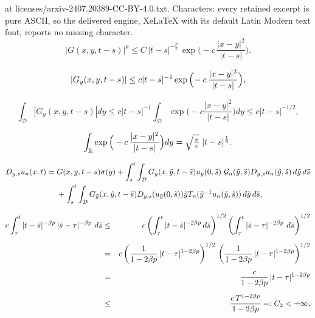 \documentclass[10pt,a4paper]{amsart}
\newcommand{\cd}{\mathcal{D}}
\newcommand{\cg}{\mathcal{G}}
\begin{document}
at licenses/arxiv-2407.20389-CC-BY-4.0.txt. Characters: every retained excerpt is pure ASCII, so the delivered engine, XeLaTeX with its default Latin Modern text font, reports no missing character.
\begin{equation}\label{ggg}
|G(x,y,t-s)|^p\leq
 C\,|t-s|^{-\frac{p}{2}}\,\exp\Big(\!-c\,\frac{|x-y|^{2}}{|t-s|}\Big).
\end{equation}

\begin{equation}\label{gen}
|G_y(x,y,t-s)|\leq
c|t-s|^{-1}\exp\Big{(}\!-c\,\frac{|x-y|^2}{|t-s|}\Big{)},
\end{equation}

\begin{equation}\label{gy}
\int_{\mathcal{D}}|G_y(x,y,t-s)|dy\leq
c|t-s|^{-1}\int_{\mathcal{D}}\exp\Big(\!-c\frac{|x-y|^2}{|t-s|}\Big)dy\leq
c|t-s|^{-1/2} ,
\end{equation}

\begin{equation}\label{kostasgaus}
\int_{\mathbb{R}}\exp\Big{(}-c\,\frac{|x-y|^{2}}{|t-s|}\Big{)}dy = \sqrt{\tfrac{\pi}{c}}\; |t-s|^{\frac{1}{2}}.
\end{equation}

\begin{equation}\label{41}
\begin{split}
D_{y,s}u_n(x,t)=\;&G(x,y,t-s)\sigma(y)+\int_s^t\int_{\cd}G_{\Tilde{y}}(x,\Tilde{y},t-\Tilde{s})u_{\Tilde{y}}(0,\Tilde{s})
 \ \cg_{n}(\Tilde{y},\Tilde{s})D_{y,s}u_n(\Tilde{y},\Tilde{s})\,d\Tilde{y}\,d\Tilde{s}
\\
&+\int_s^t\int_{\cd}G_{\Tilde{y}}(x,\Tilde{y},t-\Tilde{s})
D_{y,s}(u_{\Tilde{y}}(0,\Tilde{s}))\Tilde{y}T_n(\Tilde{y}^{-1}u_n(\Tilde{y},\Tilde{s}))\,d\Tilde{y}\,d\Tilde{s},
\end{split}
\end{equation}

\begin{eqnarray}
c\int_\tau^t|t-\Tilde{s}|^{-\beta p} \, |\tilde{s}-\tau|^{-\beta p} \,  \,d\tilde{s}
& \leq &
c\left(\int_\tau^t|t-\Tilde{s}|^{-2 \beta p} \,d\tilde{s}\right)^{1/2} 
\left( \int_\tau^t|\tilde{s}-\tau|^{-2 \beta p} \, \,d\tilde{s}\right)^{1/2}
\nonumber\\[0.5em]
&=&
c\left(\frac{1}{1-2 \beta p}\, |t-\tau|^{1-2 \beta p}\right)^{1/2} \, \left(\frac{1}{1-2 \beta p}\, |t-\tau|^{1-2 \beta p}\right)^{1/2}
\nonumber\\[0.5em]
&=&
\frac{c}{1-2 \beta p}\, |t-\tau|^{1-2 \beta p}
\nonumber\\[0.5em]
&\leq &
\frac{c\, T^{1-2 \beta p}}{1-2 \beta p} =: C_2  <+\infty ,\label{hineq}
\end{eqnarray}
\end{document}
